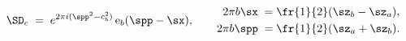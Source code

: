 \begin{equation}\label{dehngen}
\SD_c\;=\;e^{2\pi i(\spp^2-c_b^2)}\,{\rm e}_b(\spp-\sx),
\qquad\begin{aligned} 2\pi b \sx \;=&\;\fr{1}{2}(\sz_b-\sz_a), \\
2\pi b \spp\;=&\;\fr{1}{2}(\sz_a+\sz_b).
\end{aligned}
\end{equation}

